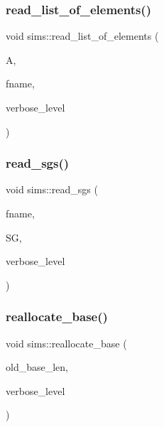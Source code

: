 \mbox{\label{classsims_ab7bb352911a48cf5c83b943be651f747}} 
\subsubsection{\texorpdfstring{read\+\_\+list\+\_\+of\+\_\+elements()}{read\_list\_of\_elements()}}
{\footnotesize\ttfamily void sims\+::read\+\_\+list\+\_\+of\+\_\+elements (\begin{DoxyParamCaption}\item[{\mbox{\hyperlink{classaction}{action}} $\ast$}]{A,  }\item[{\mbox{\hyperlink{galois_8h_ab6cc7b4aeb6ea31aba2b3fbfc83ff5e6}{B\+Y\+TE}} $\ast$}]{fname,  }\item[{\mbox{\hyperlink{galois_8h_a09fddde158a3a20bd2dcadb609de11dc}{I\+NT}}}]{verbose\+\_\+level }\end{DoxyParamCaption})}

\mbox{\label{classsims_acc819864b418090e81b8a060cdc384df}} 
\subsubsection{\texorpdfstring{read\+\_\+sgs()}{read\_sgs()}}
{\footnotesize\ttfamily void sims\+::read\+\_\+sgs (\begin{DoxyParamCaption}\item[{const \mbox{\hyperlink{galois_8h_ab6cc7b4aeb6ea31aba2b3fbfc83ff5e6}{B\+Y\+TE}} $\ast$}]{fname,  }\item[{\mbox{\hyperlink{classvector__ge}{vector\+\_\+ge}} $\ast$}]{SG,  }\item[{\mbox{\hyperlink{galois_8h_a09fddde158a3a20bd2dcadb609de11dc}{I\+NT}}}]{verbose\+\_\+level }\end{DoxyParamCaption})}

\mbox{\label{classsims_a9768b0070683ba04b4211aa8d0de7fbd}} 
\subsubsection{\texorpdfstring{reallocate\+\_\+base()}{reallocate\_base()}}
{\footnotesize\ttfamily void sims\+::reallocate\+\_\+base (\begin{DoxyParamCaption}\item[{\mbox{\hyperlink{galois_8h_a09fddde158a3a20bd2dcadb609de11dc}{I\+NT}}}]{old\+\_\+base\+\_\+len,  }\item[{\mbox{\hyperlink{galois_8h_a09fddde158a3a20bd2dcadb609de11dc}{I\+NT}}}]{verbose\+\_\+level }\end{DoxyParamCaption})}

